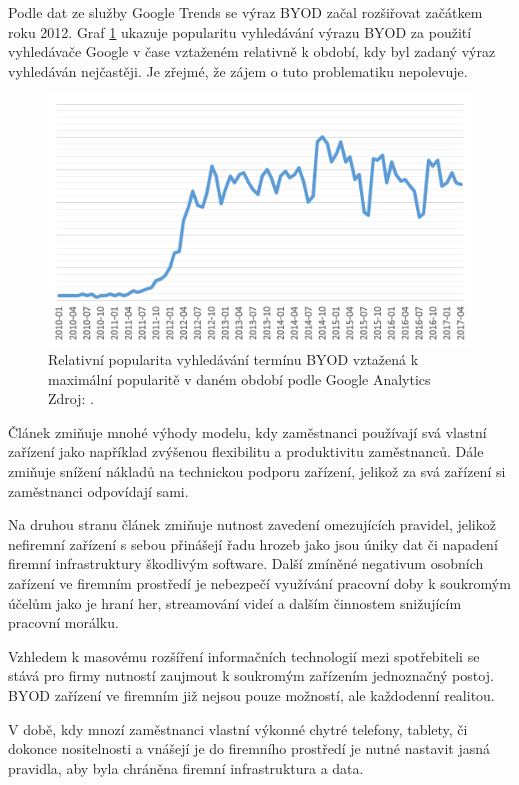 Podle dat ze služby Google Trends \cite{GoogleTrends} se výraz BYOD začal rozšiřovat začátkem roku 2012. Graf \ref{hledaniBYOD} ukazuje popularitu vyhledávání výrazu BYOD za použití vyhledávače Google v čase vztaženém relativně k období, kdy byl zadaný výraz vyhledáván nejčastěji. Je zřejmé, že zájem o tuto problematiku nepolevuje.

\begin{figure}[h!]\label{hledaniBYOD}
\centering
\includegraphics[width=13cm]{img/hledaniBYOD}
\caption{Relativní popularita vyhledávání termínu BYOD vztažená k maximální popularitě v daném období podle Google Analytics Zdroj: \cite{GoogleTrends}.} 
\end{figure}
 

Článek \cite{stagliano2013consumerization} zmiňuje mnohé výhody modelu, kdy zaměstnanci používají svá vlastní zařízení jako například zvýšenou flexibilitu a produktivitu zaměstnanců. Dále zmiňuje snížení nákladů na technickou podporu zařízení, jelikož za svá zařízení si zaměstnanci odpovídají sami.

Na druhou stranu článek zmiňuje nutnost zavedení omezujících pravidel, jelikož nefiremní zařízení s sebou přinášejí řadu hrozeb jako jsou úniky dat či napadení firemní infrastruktury škodlivým software.  Další zmíněné negativum osobních zařízení ve firemním prostředí je nebezpečí využívání pracovní doby k soukromým účelům jako je hraní her, streamování videí a dalším činnostem snižujícím pracovní morálku.

Vzhledem k masovému rozšíření informačních technologií mezi spotřebiteli se stává pro firmy nutností zaujmout k soukromým zařízením jednoznačný postoj. BYOD zařízení ve firemním již nejsou pouze možností, ale každodenní realitou.

V době, kdy mnozí zaměstnanci vlastní výkonné chytré telefony, tablety, či dokonce nositelnosti a vnášejí je do firemního prostředí je nutné nastavit jasná pravidla, aby byla chráněna firemní infrastruktura a data.

